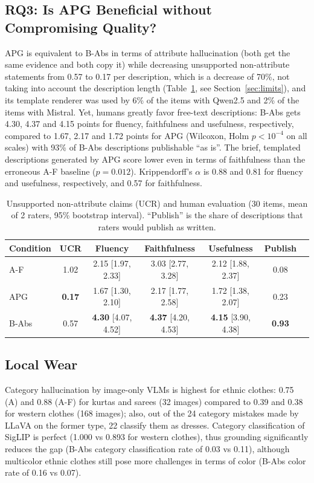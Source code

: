\documentclass[runningheads]{llncs}
\newcommand{\cond}[1]{\textsf{#1}}
\begin{document}
\subsection{RQ3: Is APG Beneficial without Compromising Quality?}
APG is equivalent to \cond{B-Abs} in terms of attribute hallucination (both get the same evidence and both copy it) while decreasing unsupported non-attribute statements from 0.57 to 0.17 per description, which is a decrease of 70\%, not taking into account the description length (Table~\ref{tab:human}, see Section~\ref{sec:limits}), and its template renderer was used by 6\% of the items with Qwen2.5 and 2\% of the items with Mistral. Yet, humans greatly favor free-text descriptions: \cond{B-Abs} gets 4.30, 4.37 and 4.15 points for fluency, faithfulness and usefulness, respectively, compared to 1.67, 2.17 and 1.72 points for APG (Wilcoxon, Holm $p<10^{-4}$ on all scales) with 93\% of \cond{B-Abs} descriptions publishable ``as is''. The brief, templated descriptions generated by APG score lower even in terms of faithfulness than the erroneous \cond{A-F} baseline ($p=0.012$). Krippendorff's $\alpha$ is 0.88 and 0.81 for fluency and usefulness, respectively, and 0.57 for faithfulness.

\begin{table}[!htb]
\caption{Unsupported non-attribute claims (UCR) and human evaluation (30 items, mean of 2 raters, 95\% bootstrap interval). ``Publish'' is the share of descriptions that raters would publish as written.}
\label{tab:human}
\centering
\footnotesize
\setlength{\tabcolsep}{3pt}
\begin{tabular}{@{}lcccccc@{}}
\toprule
Condition & UCR & Fluency & Faithfulness & Usefulness & Publish \\
\midrule
\cond{A-F} & 1.02 & 2.15 [1.97, 2.33] & 3.03 [2.77, 3.28] & 2.12 [1.88, 2.37] & 0.08 \\
\cond{APG} & \textbf{0.17} & 1.67 [1.30, 2.10] & 2.17 [1.77, 2.58] & 1.72 [1.38, 2.07] & 0.23 \\
\cond{B-Abs} & 0.57 & \textbf{4.30} [4.07, 4.52] & \textbf{4.37} [4.20, 4.53] & \textbf{4.15} [3.90, 4.38] & \textbf{0.93} \\
\bottomrule
\end{tabular}
\end{table}

\subsection{Local Wear}
Category hallucination by image-only VLMs is highest for ethnic clothes: 0.75 (\cond{A}) and 0.88 (\cond{A-F}) for kurtas and sarees (32 images) compared to 0.39 and 0.38 for western clothes (168 images); also, out of the 24 category mistakes made by LLaVA on the former type, 22 classify them as dresses. Category classification of SigLIP is perfect (1.000 vs 0.893 for western clothes), thus grounding significantly reduces the gap (\cond{B-Abs} category classification rate of 0.03 vs 0.11), although multicolor ethnic clothes still pose more challenges in terms of color (\cond{B-Abs} color rate of 0.16 vs 0.07).
\end{document}
